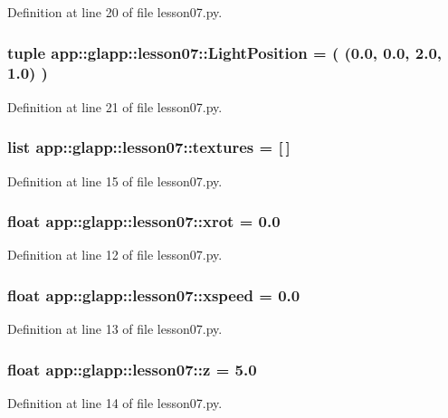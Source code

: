 Definition at line 20 of file lesson07.py.
\subsubsection{\setlength{\rightskip}{0pt plus 5cm}tuple {\bf app::glapp::lesson07::LightPosition} = ( (0.0, 0.0, 2.0, 1.0) )\hspace{0.3cm}{\tt  [static]}}\label{namespaceapp_1_1glapp_1_1lesson07_9bd3996389e2861045badcec64a2b681}




Definition at line 21 of file lesson07.py.
\subsubsection{\setlength{\rightskip}{0pt plus 5cm}list {\bf app::glapp::lesson07::textures} = [$\,$]\hspace{0.3cm}{\tt  [static]}}\label{namespaceapp_1_1glapp_1_1lesson07_9715da2147bd82a93fe57d26145fdb29}




Definition at line 15 of file lesson07.py.
\subsubsection{\setlength{\rightskip}{0pt plus 5cm}float {\bf app::glapp::lesson07::xrot} = 0.0\hspace{0.3cm}{\tt  [static]}}\label{namespaceapp_1_1glapp_1_1lesson07_d6f9dab04f7842c83a30a2c5aa52fc4b}




Definition at line 12 of file lesson07.py.
\subsubsection{\setlength{\rightskip}{0pt plus 5cm}float {\bf app::glapp::lesson07::xspeed} = 0.0\hspace{0.3cm}{\tt  [static]}}\label{namespaceapp_1_1glapp_1_1lesson07_3d9beb9fdc3a7da298bc0e26feae5c50}




Definition at line 13 of file lesson07.py.
\subsubsection{\setlength{\rightskip}{0pt plus 5cm}float {\bf app::glapp::lesson07::z} = 5.0\hspace{0.3cm}{\tt  [static]}}\label{namespaceapp_1_1glapp_1_1lesson07_b3c5de425e207fbc7949fd6f4f611755}




Definition at line 14 of file lesson07.py.
